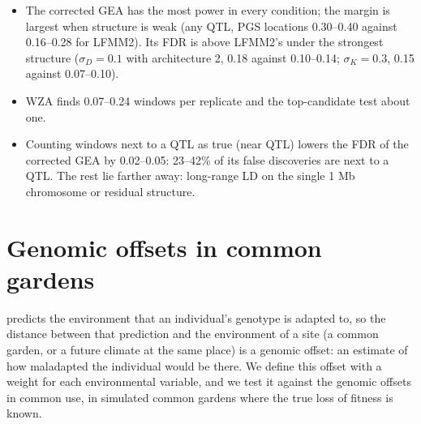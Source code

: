 \begin{itemize}
\item The corrected GEA has the most power in every condition; the margin
  is largest when structure is weak (any QTL, PGS locations 0.30--0.40
  against 0.16--0.28 for LFMM2). Its FDR is above LFMM2's under the
  strongest structure ($\sigma_D=0.1$ with architecture 2, 0.18 against
  0.10--0.14; $\sigma_K=0.3$, 0.15 against 0.07--0.10).
\item WZA finds 0.07--0.24 windows per replicate and the top-candidate test
  about one.
\item Counting windows next to a QTL as true (near QTL) lowers the FDR of
  the corrected GEA by 0.02--0.05: 23--42\% of its false discoveries are
  next to a QTL. The rest lie farther away: long-range LD on the single
  1 Mb chromosome or residual structure.
\end{itemize}



\section{Genomic offsets in common gardens}
\label{sec:offsets}

\ecolocator predicts the environment that an individual's genotype is
adapted to, so the distance between that prediction and the environment of
a site (a common garden, or a future climate at the same place) is a
genomic offset: an estimate of how maladapted the individual would be
there. We define this offset with a weight for each environmental variable,
and we test it against the genomic offsets in common use, in simulated
common gardens where the true loss of fitness is known.

